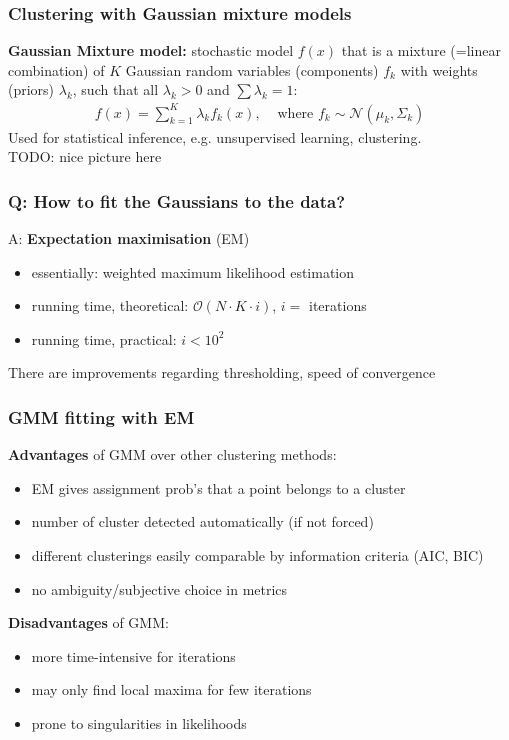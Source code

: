 \begin{frame}\frametitle{Clustering with Gaussian mixture models}
\textbf{Gaussian Mixture model:} stochastic model $f(x)$ that is a mixture (=linear combination) of $K$ Gaussian random variables (components) $f_k$ with weights (priors) $\lambda_k$, such that all $\lambda_k >0$ and $\sum \lambda_k = 1$: 
\begin{align*} f(x) = \sum_{k=1}^K \lambda_k f_k(x), &\text{ where } f_k \sim \mathcal{N}(\mu_k, \Sigma_k)
\end{align*}
Used for statistical inference, e.g. unsupervised learning, clustering. \\
\vspace{1cm}
TODO: nice picture here
\end{frame}

\begin{frame}\frametitle{Q: How to fit the Gaussians to the data?}
{\Large A: \textbf{Expectation maximisation} (EM)}\\
\begin{itemize}
\item essentially: weighted maximum likelihood estimation
\item running time, theoretical: $\mathcal{O}(N\cdot K\cdot i)$, $i=$ iterations
\item running time, practical: $i < 10^2$
\end{itemize}
\begin{algorithmic}
\end{algorithmic}
There are improvements regarding thresholding, speed of convergence
\end{frame}

\begin{frame}\frametitle{GMM fitting with EM}
\textbf{Advantages} of GMM over other clustering methods:
\begin{itemize}
\item EM gives assignment prob's that a point belongs to a cluster
\item number of cluster detected automatically (if not forced)
\item different clusterings easily comparable by information criteria (AIC, BIC)
\item no ambiguity/subjective choice in metrics
\end{itemize}
\textbf{Disadvantages} of GMM:
\begin{itemize}
\item more time-intensive for iterations 
\item may only find local maxima for few iterations
\item prone to singularities in likelihoods
\end{itemize}
\end{frame}